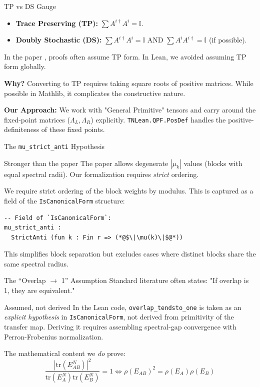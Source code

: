 \documentclass[aspectratio=169,10pt]{beamer}
\newcommand{\trace}{\mathrm{tr}}
\begin{document}
\begin{frame}{TP vs DS Gauge}
    \begin{itemize}
        \item \textbf{Trace Preserving (TP):} $\sum A^{i\dagger} A^i = \mathbb{I}$.
        \item \textbf{Doubly Stochastic (DS):} $\sum A^{i\dagger} A^i = \mathbb{I}$ AND $\sum A^i A^{i\dagger} = \mathbb{I}$ (if possible).
    \end{itemize}

    In the paper \cite{Cirac2021Matrix}, proofs often assume TP form.
    In Lean, we avoided assuming TP form globally.
    
    \textbf{Why?}
    Converting to TP requires taking square roots of positive matrices. While possible in Mathlib, it complicates the constructive nature.
    
    \textbf{Our Approach:}
    We work with "General Primitive" tensors and carry around the fixed-point matrices ($\Lambda_L, \Lambda_R$) explicitly.
    \texttt{TNLean.QPF.PosDef} handles the positive-definiteness of these fixed points.
\end{frame}

\begin{frame}[fragile]{The \texttt{mu\_strict\_anti} Hypothesis}
    \begin{alertblock}{Stronger than the paper}
        The paper \cite{Cirac2021Matrix} allows degenerate $|\mu_k|$ values (blocks with equal spectral radii).
        Our formalization requires \emph{strict} ordering.
    \end{alertblock}

    We require strict ordering of the block weights by modulus.
    This is captured as a field of the \texttt{IsCanonicalForm} structure:

    \begin{lstlisting}[language=Lean]
-- Field of `IsCanonicalForm`:
mu_strict_anti :
  StrictAnti (fun k : Fin r => (*@$\|\mu(k)\|$@*))
    \end{lstlisting}

    This simplifies block separation but excludes cases where distinct
    blocks share the same spectral radius.
\end{frame}

\begin{frame}{The ``Overlap $\to$ 1'' Assumption}
    Standard literature often states:
    "If overlap is 1, they are equivalent."
    
    \begin{alertblock}{Assumed, not derived}
        In the Lean code, \texttt{overlap\_tendsto\_one} is taken as an \emph{explicit hypothesis}
        in \texttt{IsCanonicalForm}, not derived from primitivity of the transfer map.
        Deriving it requires assembling spectral-gap convergence with
        Perron-Frobenius normalization.
    \end{alertblock}

    The mathematical content we \emph{do} prove:
    \[ \frac{|\trace(E_{AB}^N)|^2}{\trace(E_A^N)\trace(E_B^N)} = 1 \iff \rho(E_{AB})^2 = \rho(E_A)\rho(E_B) \]
\end{frame}
\end{document}
